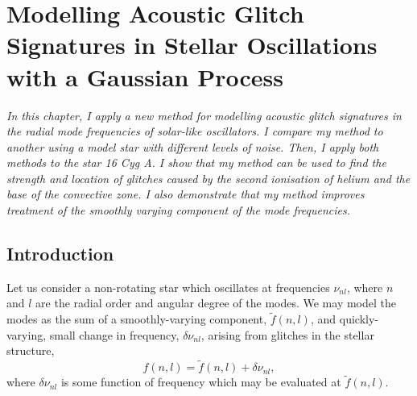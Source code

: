 %
%
%
%
%
\chapter[Modelling Acoustic Glitches with a Gaussian Process]{Modelling Acoustic Glitch Signatures in Stellar Oscillations with a Gaussian Process}\label{chap:glitch-gp}

\textit{In this chapter, I apply a new method for modelling acoustic glitch signatures in the radial mode frequencies of solar-like oscillators. I compare my method to another using a model star with different levels of noise. Then, I apply both methods to the star 16 Cyg A. I show that my method can be used to find the strength and location of glitches caused by the second ionisation of helium and the base of the convective zone. I also demonstrate that my method improves treatment of the smoothly varying component of the mode frequencies.}

\section{Introduction}

Let us consider a non-rotating star which oscillates at frequencies \(\nu_{nl}\), where \(n\) and \(l\) are the radial order and angular degree of the modes. We may model the modes as the sum of a smoothly-varying component, \(\tilde{f}(n, l)\), and quickly-varying, small change in frequency, \(\delta\nu_{nl}\), arising from glitches in the stellar structure,
%
\begin{equation}
    f(n, l) = \tilde{f}(n, l) + \delta\nu_{nl},\label{eq:general-glitch}
\end{equation}
%
where \(\delta\nu_{nl}\) is some function of frequency which may be evaluated at \(\tilde{f}(n, l)\).

